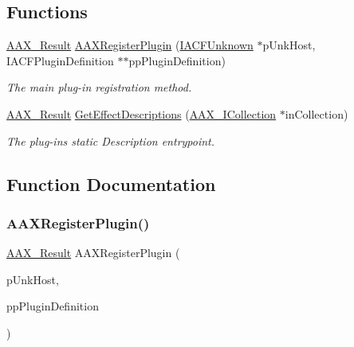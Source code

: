 \subsection*{Functions}
\begin{DoxyCompactItemize}
\item 
\mbox{\hyperlink{a00392_a4d8f69a697df7f70c3a8e9b8ee130d2f}{A\+A\+X\+\_\+\+Result}} \mbox{\hyperlink{a00796_ga83d05333118598c179ca6d89487fa203}{A\+A\+X\+Register\+Plugin}} (\mbox{\hyperlink{a01409}{I\+A\+C\+F\+Unknown}} $\ast$p\+Unk\+Host, I\+A\+C\+F\+Plugin\+Definition $\ast$$\ast$pp\+Plugin\+Definition)
\begin{DoxyCompactList}\small\item\em The main plug-\/in registration method. \end{DoxyCompactList}\item 
\mbox{\hyperlink{a00392_a4d8f69a697df7f70c3a8e9b8ee130d2f}{A\+A\+X\+\_\+\+Result}} \mbox{\hyperlink{a00796_gae0d356eef326f77cbb972e48946d4892}{Get\+Effect\+Descriptions}} (\mbox{\hyperlink{a01777}{A\+A\+X\+\_\+\+I\+Collection}} $\ast$in\+Collection)
\begin{DoxyCompactList}\small\item\em The plug-\/in\textquotesingle{}s static Description entrypoint. \end{DoxyCompactList}\end{DoxyCompactItemize}


\subsection{Function Documentation}
\mbox{\label{a00796_ga83d05333118598c179ca6d89487fa203}} 
\subsubsection{\texorpdfstring{AAXRegisterPlugin()}{AAXRegisterPlugin()}}
{\footnotesize\ttfamily \mbox{\hyperlink{a00392_a4d8f69a697df7f70c3a8e9b8ee130d2f}{A\+A\+X\+\_\+\+Result}} A\+A\+X\+Register\+Plugin (\begin{DoxyParamCaption}\item[{\mbox{\hyperlink{a01409}{I\+A\+C\+F\+Unknown}} $\ast$}]{p\+Unk\+Host,  }\item[{I\+A\+C\+F\+Plugin\+Definition $\ast$$\ast$}]{pp\+Plugin\+Definition }\end{DoxyParamCaption})}



